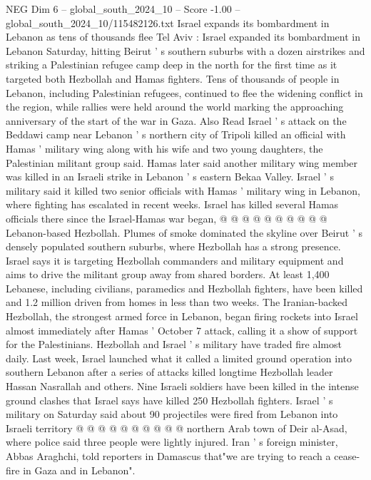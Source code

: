 \begin{textsample}{NEG Dim 6 – global\_south\_2024\_10 – Score -1.00 – global\_south\_2024\_10/115482126.txt}  \label{ex:f6_neg_032}
Israel expands its bombardment in Lebanon as tens of thousands flee Tel Aviv : Israel expanded its bombardment in Lebanon Saturday, hitting Beirut ' s southern suburbs with a dozen airstrikes and striking a Palestinian refugee camp deep in the north for the first time as it targeted both Hezbollah and Hamas fighters.
Tens of thousands of people in Lebanon, including Palestinian refugees, continued to flee the widening conflict in the region, while rallies were held around the world marking the approaching anniversary of the start of the war in Gaza.
Also Read Israel ' s attack on the Beddawi camp near Lebanon ' s northern city of Tripoli killed an official with Hamas ' military wing along with his wife and two young daughters, the Palestinian militant group said.
Hamas later said another military wing member was killed in an Israeli strike in Lebanon ' s eastern Bekaa Valley.
Israel ' s military said it killed two senior officials with Hamas ' military wing in Lebanon, where fighting has escalated in recent weeks.
Israel has killed several Hamas officials there since the Israel-Hamas war began, @ @ @ @ @ @ @ @ @ @ Lebanon-based Hezbollah.
Plumes of smoke dominated the skyline over Beirut ' s densely populated southern suburbs, where Hezbollah has a strong presence.
Israel says it is targeting Hezbollah commanders and military equipment and aims to drive the militant group away from shared borders.
At least 1,400 Lebanese, including civilians, paramedics and Hezbollah fighters, have been killed and 1.2 million driven from homes in less than two weeks.
The Iranian-backed Hezbollah, the strongest armed force in Lebanon, began firing rockets into Israel almost immediately after Hamas ' October 7 attack, calling it a show of support for the Palestinians.
Hezbollah and Israel ' s military have traded fire almost daily.
Last week, Israel launched what it called a limited ground operation into southern Lebanon after a series of attacks killed longtime Hezbollah leader Hassan Nasrallah and others.
Nine Israeli soldiers have been killed in the intense ground clashes that Israel says have killed 250 Hezbollah fighters.
Israel ' s military on Saturday said about 90 projectiles were fired from Lebanon into Israeli territory @ @ @ @ @ @ @ @ @ @ northern Arab town of Deir al-Asad, where police said three people were lightly injured.
Iran ' s foreign minister, Abbas Araghchi, told reporters in Damascus that"we are trying to reach a cease-fire in Gaza and in Lebanon".

\end{textsample}
